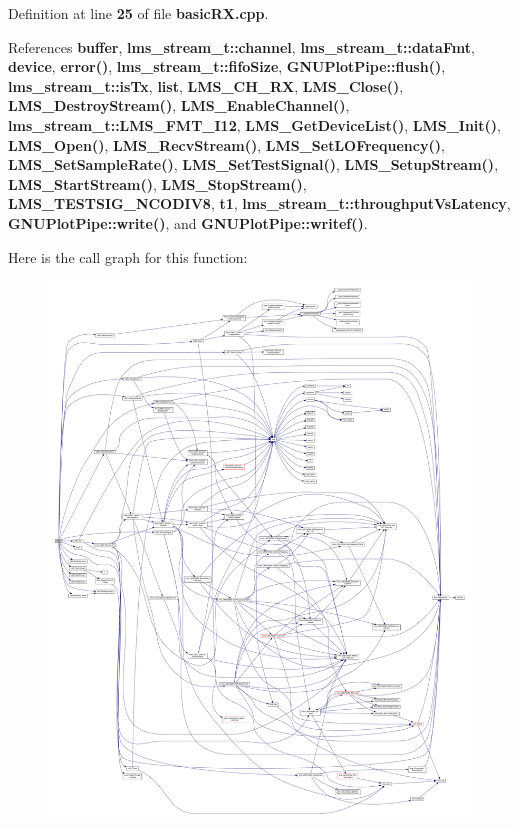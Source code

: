 Definition at line {\bf 25} of file {\bf basic\+R\+X.\+cpp}.



References {\bf buffer}, {\bf lms\+\_\+stream\+\_\+t\+::channel}, {\bf lms\+\_\+stream\+\_\+t\+::data\+Fmt}, {\bf device}, {\bf error()}, {\bf lms\+\_\+stream\+\_\+t\+::fifo\+Size}, {\bf G\+N\+U\+Plot\+Pipe\+::flush()}, {\bf lms\+\_\+stream\+\_\+t\+::is\+Tx}, {\bf list}, {\bf L\+M\+S\+\_\+\+C\+H\+\_\+\+RX}, {\bf L\+M\+S\+\_\+\+Close()}, {\bf L\+M\+S\+\_\+\+Destroy\+Stream()}, {\bf L\+M\+S\+\_\+\+Enable\+Channel()}, {\bf lms\+\_\+stream\+\_\+t\+::\+L\+M\+S\+\_\+\+F\+M\+T\+\_\+\+I12}, {\bf L\+M\+S\+\_\+\+Get\+Device\+List()}, {\bf L\+M\+S\+\_\+\+Init()}, {\bf L\+M\+S\+\_\+\+Open()}, {\bf L\+M\+S\+\_\+\+Recv\+Stream()}, {\bf L\+M\+S\+\_\+\+Set\+L\+O\+Frequency()}, {\bf L\+M\+S\+\_\+\+Set\+Sample\+Rate()}, {\bf L\+M\+S\+\_\+\+Set\+Test\+Signal()}, {\bf L\+M\+S\+\_\+\+Setup\+Stream()}, {\bf L\+M\+S\+\_\+\+Start\+Stream()}, {\bf L\+M\+S\+\_\+\+Stop\+Stream()}, {\bf L\+M\+S\+\_\+\+T\+E\+S\+T\+S\+I\+G\+\_\+\+N\+C\+O\+D\+I\+V8}, {\bf t1}, {\bf lms\+\_\+stream\+\_\+t\+::throughput\+Vs\+Latency}, {\bf G\+N\+U\+Plot\+Pipe\+::write()}, and {\bf G\+N\+U\+Plot\+Pipe\+::writef()}.



Here is the call graph for this function\+:
\nopagebreak
\begin{figure}[H]
\begin{center}
\leavevmode
\includegraphics[width=350pt]{d4/d20/basicRX_8cpp_a3c04138a5bfe5d72780bb7e82a18e627_cgraph}
\end{center}
\end{figure}




